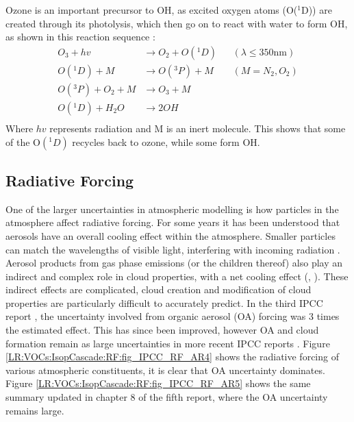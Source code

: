    Ozone is an important precursor to OH, as excited oxygen atoms (O(${}^1$D)) are created through its photolysis, which then go on to react with water to form OH, as shown in this reaction sequence \parencite{Atkinson2000, AtkinsonArey2003}:
    \begin{equation}
      \begin{aligned}
        O_3+hv            & \to  O_2 + O({}^1D)   && (\lambda \le 350 \text{nm}) \\%
        O({}^1D)+M        & \to  O({}^3P) + M     && (M=N_2, O_2)               \\%
        O({}^3P)+O_2 + M  & \to  O_3 + M          &&                           \\%
        O({}^1D)+H_2O     & \to  2OH              &&                            \\%
      \end{aligned}
      \label{LR:Atmos:Chem:eqn_O3toOH}
    \end{equation}
    Where $hv$ represents radiation and M is an inert molecule.
    This shows that some of the O$({}^1D)$ recycles back to ozone, while some form OH.
      
  \subsection{Radiative Forcing}
    \label{LR:VOCs:IsopCascade:RF}
    
    One of the larger uncertainties in atmospheric modelling is how particles in the atmosphere affect radiative forcing.
    For some years it has been understood that aerosols have an overall cooling effect within the atmosphere.
    Smaller particles can match the wavelengths of visible light, interfering with incoming radiation \parencite{Kanakidou2005}.
    Aerosol products from gas phase emissions (or the children thereof) also play an indirect and complex role in cloud properties, with a net cooling effect (\textcite{Kanakidou2005}, \textcite[Chapter 7,8]{IPCC_AR5_WG1}).
    These indirect effects are complicated, cloud creation and modification of cloud properties are particularly difficult to accurately predict.
    In the third IPCC report \parencite{IPCC2001}, the uncertainty involved from organic aerosol (OA) forcing was 3 times the estimated effect.
    This has since been improved, however OA and cloud formation remain as large uncertainties in more recent IPCC reports \parencite{IPCC_Chapter2}.
    Figure \ref{LR:VOCs:IsopCascade:RF:fig_IPCC_RF_AR4} shows the radiative forcing of various atmospheric constituents, it is clear that OA uncertainty dominates.
    Figure \ref{LR:VOCs:IsopCascade:RF:fig_IPCC_RF_AR5} shows the same summary updated in chapter 8 of the fifth report, where the OA uncertainty remains large.
    
